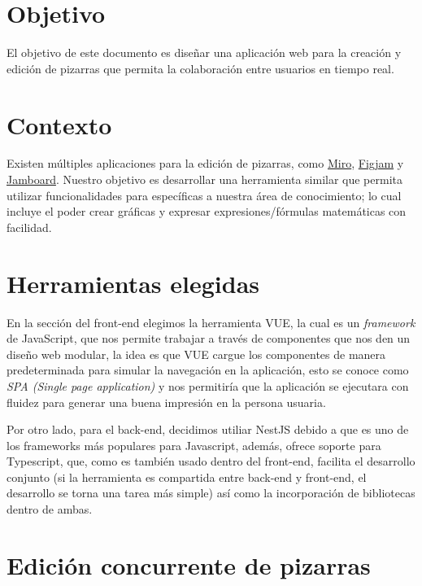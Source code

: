 \documentclass[a4paper, oneside, final]{scrartcl}
\begin{document}


\section{Objetivo}

El objetivo de este documento es diseñar una aplicación web para la creación y edición de pizarras que permita la colaboración entre usuarios en tiempo real.

\section{Contexto}

Existen múltiples aplicaciones para la edición de pizarras, como 
\href{https://miro.com/}{Miro}, \href{https://www.figma.com/figjam/}{Figjam} y \href{https://jamboard.google.com}{Jamboard}. Nuestro objetivo es desarrollar una herramienta similar que permita utilizar funcionalidades para específicas a nuestra área de conocimiento; lo cual incluye el poder crear gráficas y expresar expresiones/fórmulas matemáticas con facilidad.

\section{Herramientas elegidas}

En la sección del front-end elegimos la herramienta VUE, la cual es un \textit{framework} de JavaScript, que nos permite trabajar a través de componentes que nos den un diseño web modular, la idea es que VUE cargue los componentes de manera predeterminada para simular la navegación en la aplicación, esto se conoce como \textit{SPA (Single page application)} y nos permitiría que la aplicación se ejecutara con fluidez para generar una buena impresión en la persona usuaria.

Por otro lado, para el back-end, decidimos utiliar NestJS debido a que es uno de los frameworks m\'as populares para Javascript, adem\'as, ofrece soporte para Typescript, que, como es tambi\'en usado dentro del front-end, facilita el desarrollo conjunto (si la herramienta es compartida entre back-end y front-end, el desarrollo se torna una tarea m\'as simple) as\'i como la incorporaci\'on de bibliotecas dentro de ambas.

\section{Edición concurrente de pizarras}
\end{document}
